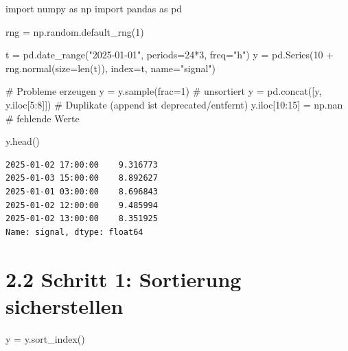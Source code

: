 \documentclass[
  ngerman,
  letterpaper,
  DIV=11]{scrreprt}
\newenvironment{Shaded}{\begin{snugshade}}{\end{snugshade}}
\newcommand{\BuiltInTok}[1]{\textcolor[rgb]{0.00,0.23,0.31}{#1}}
\newcommand{\CommentTok}[1]{\textcolor[rgb]{0.37,0.37,0.37}{#1}}
\newcommand{\DecValTok}[1]{\textcolor[rgb]{0.68,0.00,0.00}{#1}}
\newcommand{\ImportTok}[1]{\textcolor[rgb]{0.00,0.46,0.62}{#1}}
\newcommand{\NormalTok}[1]{\textcolor[rgb]{0.00,0.23,0.31}{#1}}
\newcommand{\OperatorTok}[1]{\textcolor[rgb]{0.37,0.37,0.37}{#1}}
\newcommand{\StringTok}[1]{\textcolor[rgb]{0.13,0.47,0.30}{#1}}
\begin{document}
\begin{Shaded}
\begin{Highlighting}[]
\ImportTok{import}\NormalTok{ numpy }\ImportTok{as}\NormalTok{ np}
\ImportTok{import}\NormalTok{ pandas }\ImportTok{as}\NormalTok{ pd}

\NormalTok{rng }\OperatorTok{=}\NormalTok{ np.random.default\_rng(}\DecValTok{1}\NormalTok{)}

\NormalTok{t }\OperatorTok{=}\NormalTok{ pd.date\_range(}\StringTok{"2025{-}01{-}01"}\NormalTok{, periods}\OperatorTok{=}\DecValTok{24}\OperatorTok{*}\DecValTok{3}\NormalTok{, freq}\OperatorTok{=}\StringTok{"h"}\NormalTok{)}
\NormalTok{y }\OperatorTok{=}\NormalTok{ pd.Series(}\DecValTok{10} \OperatorTok{+}\NormalTok{ rng.normal(size}\OperatorTok{=}\BuiltInTok{len}\NormalTok{(t)), index}\OperatorTok{=}\NormalTok{t, name}\OperatorTok{=}\StringTok{"signal"}\NormalTok{)}

\CommentTok{\# Probleme erzeugen}
\NormalTok{y }\OperatorTok{=}\NormalTok{ y.sample(frac}\OperatorTok{=}\DecValTok{1}\NormalTok{)                      }\CommentTok{\# unsortiert}
\NormalTok{y }\OperatorTok{=}\NormalTok{ pd.concat([y, y.iloc[}\DecValTok{5}\NormalTok{:}\DecValTok{8}\NormalTok{]])           }\CommentTok{\# Duplikate (append ist deprecated/entfernt)}
\NormalTok{y.iloc[}\DecValTok{10}\NormalTok{:}\DecValTok{15}\NormalTok{] }\OperatorTok{=}\NormalTok{ np.nan                    }\CommentTok{\# fehlende Werte}

\NormalTok{y.head()}
\end{Highlighting}
\end{Shaded}

\begin{verbatim}
2025-01-02 17:00:00    9.316773
2025-01-03 15:00:00    8.892627
2025-01-01 03:00:00    8.696843
2025-01-02 12:00:00    9.485994
2025-01-02 13:00:00    8.351925
Name: signal, dtype: float64
\end{verbatim}

\section{2.2 Schritt 1: Sortierung
sicherstellen}\label{schritt-1-sortierung-sicherstellen}

\begin{Shaded}
\begin{Highlighting}[]
\NormalTok{y }\OperatorTok{=}\NormalTok{ y.sort\_index()}
\end{Highlighting}
\end{Shaded}
\end{document}
